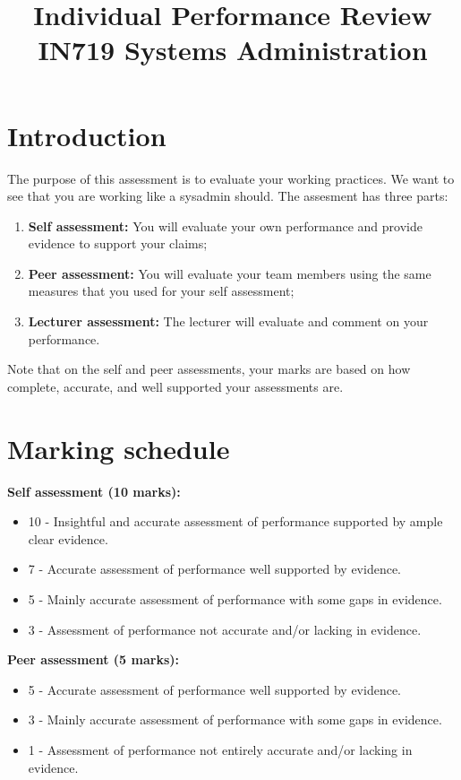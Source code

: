 \documentclass{article}   	%
\title{Individual Performance Review\\ IN719 Systems Administration}
\date{}							%
\begin{document}
\maketitle

\section*{Introduction}
The purpose of this assessment is to evaluate your working practices.  We want to see that you are working like a sysadmin should.  The assesment has three parts:

\begin{enumerate}
  \item  \textbf{Self assessment:}  You will evaluate your own performance and provide evidence to support your claims;
  \item  \textbf{Peer assessment:}  You will evaluate your team members using the same measures that you used for your self assessment;
  \item  \textbf{Lecturer assessment:}  The lecturer will evaluate and comment on your performance.
\end{enumerate}

Note that on the self and peer assessments, your marks are based on how complete, accurate, and well supported your assessments are.

\section*{Marking schedule}
\textbf{Self assessment (10 marks):}

\begin{itemize}
  \item 10 - Insightful and accurate assessment of performance supported by ample clear evidence.
  \item 7 - Accurate assessment of performance well supported by evidence.
  \item 5 - Mainly accurate assessment of performance with some gaps in evidence.
  \item 3 - Assessment of performance not accurate and/or lacking in evidence.
\end{itemize}

\textbf{Peer assessment (5 marks):}

\begin{itemize}
  \item 5 - Accurate assessment of performance well supported by evidence.
  \item 3 - Mainly accurate assessment of performance with some gaps in evidence.
  \item 1 - Assessment of performance not entirely accurate and/or lacking in evidence.
\end{itemize}
\end{document}
